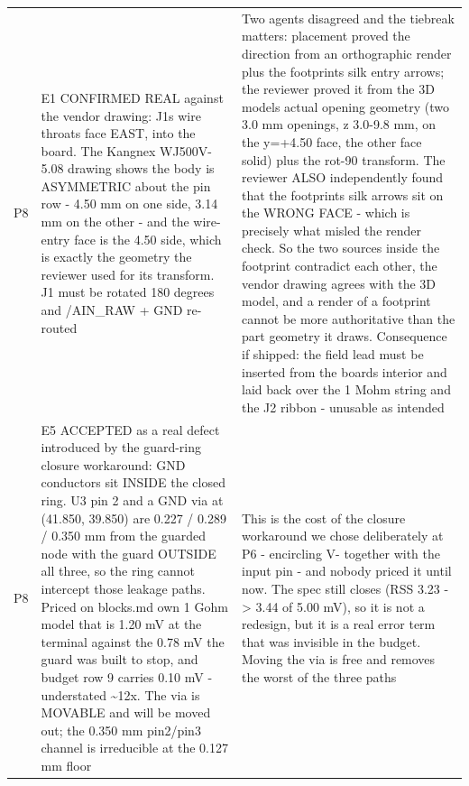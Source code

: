 \documentclass[11pt,a4paper]{article}
\begin{document}
{\begin{longtable}{lp{5.2cm}p{7.2cm}}
P8 & E1 CONFIRMED REAL against the vendor drawing: J1s wire throats face EAST, into the board. The Kangnex WJ500V-5.08 drawing shows the body is ASYMMETRIC about the pin row - 4.50 mm on one side, 3.14 mm on the other - and the wire-entry face is the 4.50 side, which is exactly the geometry the reviewer used for its transform. J1 must be rotated 180 degrees and /AIN\_RAW + GND re-routed & Two agents disagreed and the tiebreak matters: placement proved the direction from an orthographic render plus the footprints silk entry arrows; the reviewer proved it from the 3D models actual opening geometry (two 3.0 mm openings, z 3.0-9.8 mm, on the y=+4.50 face, the other face solid) plus the rot-90 transform. The reviewer ALSO independently found that the footprints silk arrows sit on the WRONG FACE - which is precisely what misled the render check. So the two sources inside the footprint contradict each other, the vendor drawing agrees with the 3D model, and a render of a footprint cannot be more authoritative than the part geometry it draws. Consequence if shipped: the field lead must be inserted from the boards interior and laid back over the 1 Mohm string and the J2 ribbon - unusable as intended \\
P8 & E5 ACCEPTED as a real defect introduced by the guard-ring closure workaround: GND conductors sit INSIDE the closed ring. U3 pin 2 and a GND via at (41.850, 39.850) are 0.227 / 0.289 / 0.350 mm from the guarded node with the guard OUTSIDE all three, so the ring cannot intercept those leakage paths. Priced on blocks.md own 1 Gohm model that is 1.20 mV at the terminal against the 0.78 mV the guard was built to stop, and budget row 9 carries 0.10 mV - understated \textasciitilde{}12x. The via is MOVABLE and will be moved out; the 0.350 mm pin2/pin3 channel is irreducible at the 0.127 mm floor & This is the cost of the closure workaround we chose deliberately at P6 - encircling V- together with the input pin - and nobody priced it until now. The spec still closes (RSS 3.23 -\textgreater{} 3.44 of 5.00 mV), so it is not a redesign, but it is a real error term that was invisible in the budget. Moving the via is free and removes the worst of the three paths \\

\end{longtable}}
\end{document}
